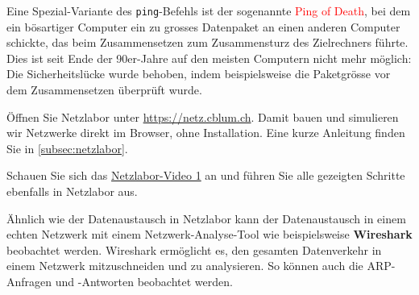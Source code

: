 \begin{mycaution}
	Eine Spezial-Variante des \texttt{ping}-Befehls ist der sogenannte \textcolor{red}{\faSkull{} Ping of Death}, bei dem ein bösartiger Computer ein zu grosses Datenpaket an einen anderen Computer schickte, das beim Zusammensetzen zum Zusammensturz des Zielrechners führte. Dies ist seit Ende der 90er-Jahre auf den meisten Computern nicht mehr möglich: Die Sicherheitslücke wurde behoben, indem beispielsweise die Paketgrösse vor dem Zusammensetzen überprüft wurde.
\end{mycaution}

\providecommand{\netzlaborvideos}{https://www.youtube.com/playlist?list=PLUfZiVdJui-57k0VcRecHX0JTEhOMgiKP}

\begin{myexercise}
	Öffnen Sie Netzlabor unter \url{https://netz.cblum.ch}. Damit bauen und simulieren wir Netzwerke direkt im Browser, ohne Installation. Eine kurze Anleitung finden Sie in \cref{subsec:netzlabor}.
\end{myexercise}

\begin{myexercise}
	Schauen Sie sich das \href{\netzlaborvideos}{Netzlabor-Video 1} an und führen Sie alle gezeigten Schritte ebenfalls in Netzlabor aus.
\end{myexercise}

Ähnlich wie der Datenaustausch in Netzlabor kann der Datenaustausch in einem echten Netzwerk mit einem Netzwerk-Analyse-Tool wie beispielsweise \textbf{Wireshark} beobachtet werden. Wireshark ermöglicht es, den gesamten Datenverkehr in einem Netzwerk mitzuschneiden und zu analysieren. So können auch die \gls{ARP}-Anfragen und -Antworten beobachtet werden.

